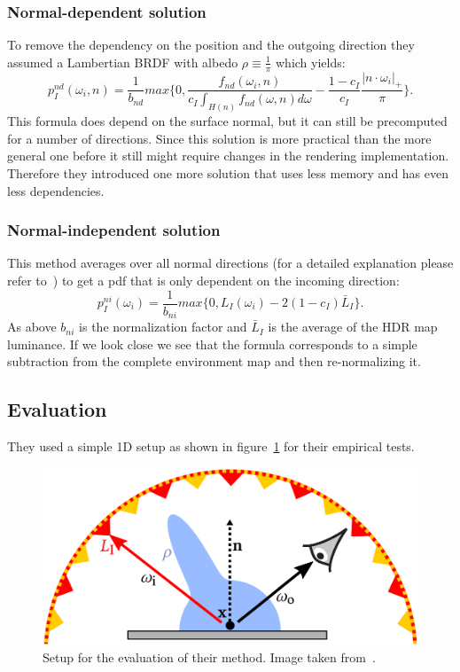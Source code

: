 \subsubsection{Normal-dependent solution}
\label{sec:ibl_normal_dependent}
To remove the dependency on the position and the outgoing direction they assumed a Lambertian BRDF with albedo $ \rho \equiv \frac{1}{\pi} $
which yields:
\begin{equation}
    \label{eq:normal_dependent}
    p_I^{nd}(\omega_i, n) = \frac{1}{b_{nd}} max\{0, \frac{f_{nd}(\omega_i, n)}{c_I \int_{H(n)} f_{nd}(\omega, n) d\omega} - \frac{1 - c_I}{c_I} \frac{|n \cdot \omega_i|_+}{\pi}\}.
\end{equation}
This formula does depend on the surface normal,
but it can still be precomputed for a number of directions.
Since this solution is more practical than the more general one before it still might require changes in the rendering implementation.
Therefore they introduced one more solution that uses less memory and has even less dependencies.


\subsubsection{Normal-independent solution}
\label{sec:ibl_normal_independent}
This method averages over all normal directions (for a detailed explanation please refer to~\cite[Appendix~D]{Karlik2019})
to get a pdf that is only dependent on the incoming direction: $$ p_I^{ni}(\omega_i) = \frac{1}{b_{ni}} max\{0, L_I(\omega_i) - 2 (1 - c_I) \bar{L}_I\}. $$
As above $ b_{ni} $ is the normalization factor and $ \bar{L}_I $ is the average of the HDR map luminance.
If we look close we see that the formula corresponds to a simple subtraction from the complete environment map and then re-normalizing it.


\subsection{Evaluation}
\label{sec:ibl_evalutiona}
They used a simple 1D setup as shown in figure~\ref{fig:ibl_setup} for their empirical tests.

\begin{figure}[h]
    \centering
    \includegraphics[width=.4\textwidth]{images/ibl_setup.png}
    \caption{Setup for the evaluation of their method.
    Image taken from~\cite[Figure~3]{Karlik2019}.}
    \label{fig:ibl_setup}
\end{figure}


